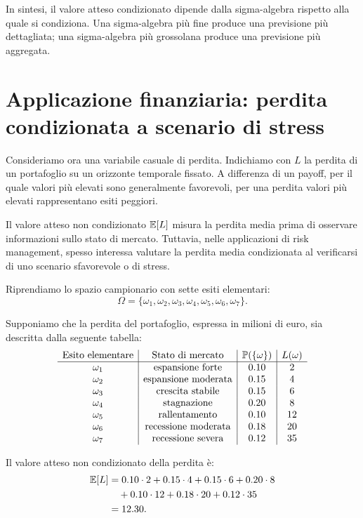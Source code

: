 In sintesi, il valore atteso condizionato dipende dalla sigma-algebra rispetto
alla quale si condiziona. Una sigma-algebra pi\`{u} fine produce una previsione
pi\`{u} dettagliata; una sigma-algebra pi\`{u} grossolana produce una
previsione pi\`{u} aggregata.

\section{Applicazione finanziaria: perdita condizionata a scenario di stress}

Consideriamo ora una variabile casuale di perdita. Indichiamo con $L$ la
perdita di un portafoglio su un orizzonte temporale fissato. A differenza di
un payoff, per il quale valori pi\`{u} elevati sono generalmente favorevoli,
per una perdita valori pi\`{u} elevati rappresentano esiti peggiori.

Il valore atteso non condizionato $\mathbb{E}[L]$ misura la perdita media
prima di osservare informazioni sullo stato di mercato. Tuttavia, nelle
applicazioni di risk management, spesso interessa valutare la perdita media
condizionata al verificarsi di uno scenario sfavorevole o di stress.

Riprendiamo lo spazio campionario con sette esiti elementari:
\[
\Omega
=
\{\omega_1,\omega_2,\omega_3,\omega_4,\omega_5,\omega_6,\omega_7\}.
\]

Supponiamo che la perdita del portafoglio, espressa in milioni di euro, sia
descritta dalla seguente tabella:
\[
\begin{array}{c|c|c|c}
\text{Esito elementare} & \text{Stato di mercato} &
\mathbb{P}(\{\omega\}) & L(\omega) \\
\hline
\omega_1 & \text{espansione forte} & 0.10 & 2 \\
\omega_2 & \text{espansione moderata} & 0.15 & 4 \\
\omega_3 & \text{crescita stabile} & 0.15 & 6 \\
\omega_4 & \text{stagnazione} & 0.20 & 8 \\
\omega_5 & \text{rallentamento} & 0.10 & 12 \\
\omega_6 & \text{recessione moderata} & 0.18 & 20 \\
\omega_7 & \text{recessione severa} & 0.12 & 35 \\
\end{array}
\]

Il valore atteso non condizionato della perdita \`{e}:
\[
\begin{aligned}
\mathbb{E}[L]
&=
0.10\cdot2
+
0.15\cdot4
+
0.15\cdot6
+
0.20\cdot8 \\
&\quad
+
0.10\cdot12
+
0.18\cdot20
+
0.12\cdot35 \\
&=
12.30.
\end{aligned}
\]

